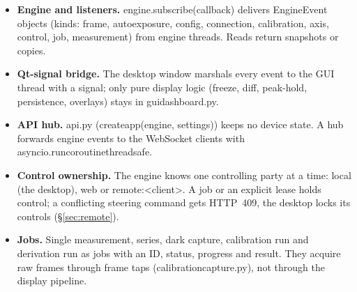 \documentclass[12pt,a4paper]{article}
\DeclareRobustCommand{\code}[1]{{\ttfamily\small\def\_{\rawus\allowbreak}#1}}
\DeclareRobustCommand{\file}[1]{{\ttfamily\small\def\_{\rawus\allowbreak}#1}}
\begin{document}
\begin{itemize}
  \item \textbf{Engine and listeners.} \code{engine.subscribe(callback)} delivers
        \code{EngineEvent} objects (kinds: \code{frame}, \code{auto\_exposure},
        \code{config}, \code{connection}, \code{calibration}, \code{axis},
        \code{control}, \code{job}, \code{measurement}) from engine threads. Reads
        return snapshots or copies.
  \item \textbf{Qt-signal bridge.} The desktop window marshals every event to the GUI
        thread with a signal; only pure display logic (freeze, diff, peak-hold,
        persistence, overlays) stays in \file{gui\_dashboard.py}.
  \item \textbf{API hub.} \file{api.py} (\code{create\_app(engine, settings)}) keeps
        no device state. A hub forwards engine events to the WebSocket clients
        with \code{asyncio.run\_coroutine\_threadsafe}.
  \item \textbf{Control ownership.} The engine knows one controlling party at a
        time: \code{local} (the desktop), \code{web} or \code{remote:<client>}. A
        job or an explicit lease holds control; a conflicting steering command
        gets HTTP~409, the desktop locks its controls (\S\ref{sec:remote}).
  \item \textbf{Jobs.} Single measurement, series, dark capture, calibration run and
        derivation run as jobs with an ID, status, progress and result. They
        acquire raw frames through frame taps (\file{calibration\_capture.py}), not
        through the display pipeline.
\end{itemize}
\end{document}
